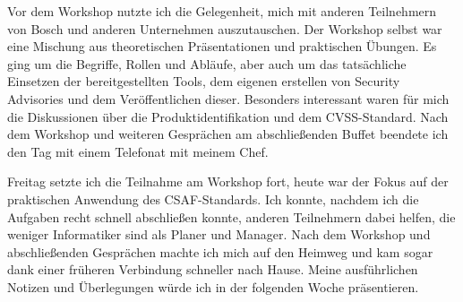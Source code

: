 Vor dem Workshop nutzte ich die Gelegenheit, mich mit anderen Teilnehmern von Bosch und anderen Unternehmen auszutauschen.
Der Workshop selbst war eine Mischung aus theoretischen Präsentationen und praktischen Übungen.
Es ging um die Begriffe, Rollen und Abläufe, aber auch um das tatsächliche Einsetzen der bereitgestellten Tools, dem eigenen erstellen von Security Advisories und dem Veröffentlichen dieser.
Besonders interessant waren für mich die Diskussionen über die Produktidentifikation und dem CVSS-Standard.
Nach dem Workshop und weiteren Gesprächen am abschließenden Buffet beendete ich den Tag mit einem Telefonat mit meinem Chef.

\sweekdaymarginpar{\weekdayFridayLong}

Freitag setzte ich die Teilnahme am Workshop fort, heute war der Fokus auf der praktischen Anwendung des CSAF-Standards.
Ich konnte, nachdem ich die Aufgaben recht schnell abschließen konnte, anderen Teilnehmern dabei helfen, die weniger Informatiker sind als Planer und Manager.
Nach dem Workshop und abschließenden Gesprächen machte ich mich auf den Heimweg und kam sogar dank einer früheren Verbindung schneller nach Hause.
Meine ausführlichen Notizen und Überlegungen würde ich in der folgenden Woche präsentieren.
